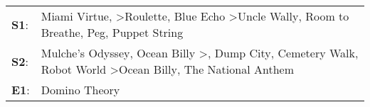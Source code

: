 \begin{supertabular}{p{0.03\textwidth}p{0.92\textwidth}}
 \textbf{S1}:  &                     Miami Virtue\textsuperscript{}, \textsuperscript{} \textgreater \enspace Roulette\textsuperscript{}, \enspace Blue Echo\textsuperscript{} \textgreater \enspace Uncle Wally\textsuperscript{}, \enspace Room to Breathe\textsuperscript{}, \enspace Peg\textsuperscript{}, \enspace Puppet String\textsuperscript{}  \enspace  \\
 \textbf{S2}:  &  Mulche's Odyssey\textsuperscript{}, \enspace Ocean Billy\textsuperscript{} \textgreater {}\textsuperscript{}, \enspace Dump City\textsuperscript{}, \enspace Cemetery Walk\textsuperscript{}, \enspace Robot World\textsuperscript{} \textgreater \enspace Ocean Billy\textsuperscript{}, \enspace The National Anthem\textsuperscript{}  \enspace  \\
 \textbf{E1}:  &                                                                                                                                                                                                                                                                                                                      Domino Theory\textsuperscript{}  \enspace  \\
\end{supertabular}
